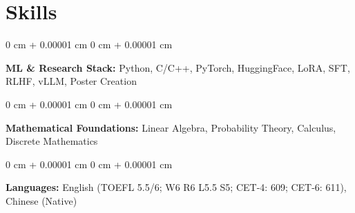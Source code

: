 \documentclass[10pt, letterpaper]{article}
\newenvironment{onecolentry}{
    \begin{adjustwidth}{
        0 cm + 0.00001 cm
    }{
        0 cm + 0.00001 cm
    }
}{
\end{adjustwidth}
} %
\begin{document}
\section{Skills}

\begin{onecolentry}
\textbf{ML \& Research Stack:} Python, C/C++, PyTorch, HuggingFace, LoRA, SFT, RLHF, vLLM, Poster Creation
\end{onecolentry}

\vspace{0.15 cm}

\begin{onecolentry}
\textbf{Mathematical Foundations:} Linear Algebra, Probability Theory, Calculus, Discrete Mathematics
\end{onecolentry}

\vspace{0.15 cm}

\begin{onecolentry}
\textbf{Languages:} English (TOEFL 5.5/6; W6 R6 L5.5 S5; CET-4: 609; CET-6: 611), Chinese (Native)
\end{onecolentry}
\end{document}

